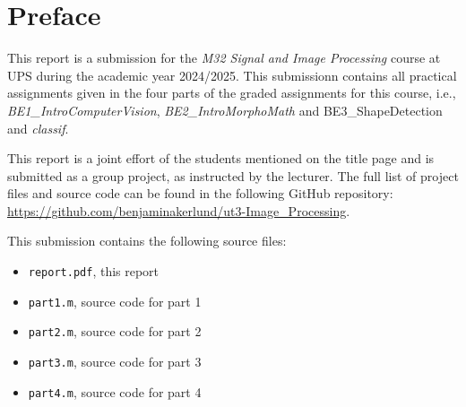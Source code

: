 \section*{Preface}


This report is a submission for the \textit{M32 Signal and Image Processing} course at \ac{UPS} during the academic year 2024/2025.
This submissionn contains all practical assignments given in the four parts of the graded assignments for this course, i.e., \textit{BE1\_IntroComputerVision}, \textit{BE2\_IntroMorphoMath} and {BE3\_ShapeDetection} and \textit{classif}.

This report is a joint effort of the students mentioned on the title page and is submitted as a group project, as instructed by the lecturer.
The full list of project files and source code can be found in the following GitHub repository: \url{https://github.com/benjaminakerlund/ut3-Image_Processing}.

This submission contains the following source files:
\begin{itemize}
    \item \verb|report.pdf|, this report
    \item \verb|part1.m|, source code for part 1
    \item \verb|part2.m|, source code for part 2
    \item \verb|part3.m|, source code for part 3
    \item \verb|part4.m|, source code for part 4
\end{itemize}




\vspace{2cm}





